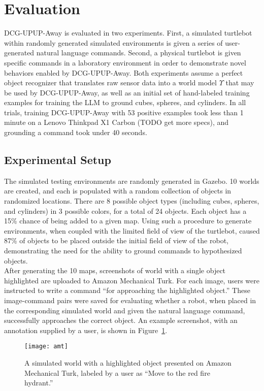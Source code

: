 \section{Evaluation}
\label{sec:evaluation}
DCG-UPUP-Away is evaluated in two experiments.
First, a simulated turtlebot within randomly generated simulated environments is given a series of user-generated natural language commands.
Second, a physical turtlebot is given specific commands in a laboratory environment in order to demonstrate novel behaviors enabled by DCG-UPUP-Away.
Both experiments assume a perfect object recognizer that translates raw sensor data into a world model $\Upsilon$ that may be used by DCG-UPUP-Away, as well as an initial set of hand-labeled training examples for training the LLM to ground cubes, spheres, and cylinders.
In all trials, training DCG-UPUP-Away with 53 positive examples took less than 1 minute on a Lenovo Thinkpad X1 Carbon (TODO get more specs), and grounding a command took under 40 seconds.\\
\subsection{Experimental Setup}
\indent The simulated testing environments are randomly generated in Gazebo.
10 worlds are created, and each is populated with a random collection of objects in randomized locations.
There are 8 possible object types (including cubes, spheres, and cylinders) in 3 possible colors, for a total of 24 objects.
Each object has a 15\% chance of being added to a given map.
Using such a procedure to generate environments, when coupled with the limited field of view of the turtlebot, caused 87\% of objects to be placed outside the initial field of view of the robot, demonstrating the need for the ability to ground commands to hypothesized objects.\\
\indent After generating the 10 maps, screenshots of world with a single object highlighted are uploaded to Amazon Mechanical Turk.
For each image, users were instructed to write a command ``for approaching the highlighted object.''
These image-command pairs were saved for evaluating whether a robot, when placed in the corresponding simulated world and given the natural language command, successfully approaches the correct object.
An example screenshot, with an annotation supplied by a user, is shown in Figure~\ref{fig:amt}.\\
\begin{figure}[h]
	\centering
    \texttt{[image: amt]}
	\caption{A simulated world with a highlighted object presented on Amazon Mechanical Turk, labeled by a user as ``Move to the red fire hydrant.''}
	\label{fig:amt}
\end{figure}

